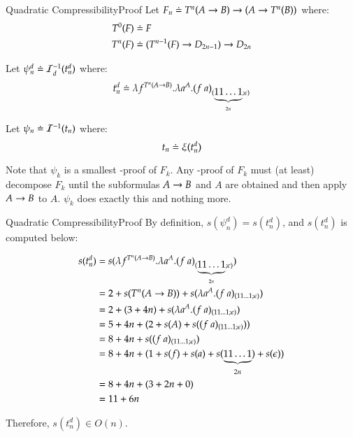 \documentclass[9pt]{beamer}
\newcommand{\mypause}{\pause}
\begin{document}
\begin{frame}{Quadratic Compressibility}{Proof}
\noindent
Let $F_n \doteq T^n(A \rightarrow B) \rightarrow ( A \rightarrow T^n(B) )$ where:
\begin{align*}
T^0(F) & \doteq F \\
T^n(F) & \doteq (T^{n-1}(F) \rightarrow D_{2n-1}) \rightarrow D_{2n}
\end{align*}

\smallskip

\mypause

\noindent
Let $\psi^d_n \doteq \mathcal{I}_d^{-1}(t^d_n)$ where:
$$
t^d_n \doteq \lambda f^{T^n(A \rightarrow B)}. \lambda a^A. (f \ a)_{(\underbrace{11\ldots 1}_{2n}; \epsilon)}
$$


\mypause

\noindent
Let $\psi_n \doteq \mathcal{I}^{-1}(t_n)$ where:
$$
t_n \doteq \xi(t^d_n)
$$

\mypause

\noindent
Note that $\psi_k$ is a smallest {\ND}-proof of $F_k$. Any {\ND}-proof of $F_k$ must (at least) decompose $F_k$ until the subformulas $A \rightarrow B$ and $A$ are obtained and then apply $A \rightarrow B$ to $A$. $\psi_k$ does exactly this and nothing more.
\end{frame}


\begin{frame}{Quadratic Compressibility}{Proof}
By definition, $s(\psi^d_n) = s(t^d_n)$, and $s(t^d_n)$ is computed below:

\medskip
\begin{small}
\begin{align*}
s(t^d_n) & = s(\lambda f^{T^n(A \imp B)}. \lambda a^A. (f \ a)_{(\underbrace{11\ldots 1}_{2n}; \eS)})  \\
 & = 2 + s(T^n(A \imp B)) + s(\lambda a^A. (f \ a)_{(11\ldots 1; \eS)})  \\
				  & = 2 + (3 + 4n) + s(\lambda a^A. (f \ a)_{(11\ldots 1; \eS)}) \\
				  & = 5 + 4n + (2 + s(A) + s((f \ a)_{(11\ldots 1; \eS)})) \\
				  & = 8 + 4n + s((f \ a)_{(11\ldots 1; \eS)}) \\	
				  & = 8 + 4n + (1 + s(f) + s(a) + s(\underbrace{11\ldots 1}_{2n}) + s(\eS)) \\			  
				  & = 8 + 4n + (3 + 2n + 0) \\			  
				  & = 11 + 6n \\					
\end{align*} 
\end{small}
Therefore, \alert{$s(t^d_n) \in O(n)$}.
\end{frame}
\end{document}
